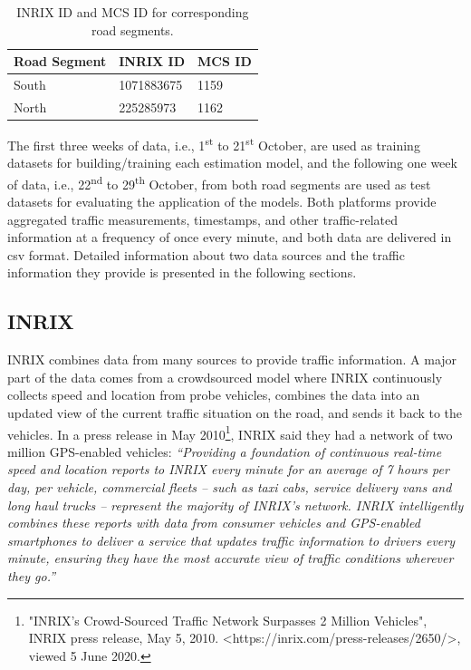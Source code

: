 \documentclass[english]{kththesis}
\begin{document}
\begin{table}[!ht]
\centering
\begin{tabular}{@{}lll@{}}
\toprule
\textbf{Road Segment} & \textbf{INRIX ID} & \textbf{MCS ID} \\
\midrule
South          & 1071883675 & 1159     \\
\midrule
North          & 225285973  & 1162     \\ 
\bottomrule
\end{tabular}
\caption{INRIX ID and MCS ID for corresponding road segments.}
\label{tab:segmentIDs}
\end{table}

The first three weeks of data, i.e., 1\textsuperscript{st} to 21\textsuperscript{st} October, are used as training datasets for building/training each estimation model, and the following one week of data, i.e., 22\textsuperscript{nd} to 29\textsuperscript{th} October, from both road segments are used as test datasets for evaluating the application of the models. Both platforms provide aggregated traffic measurements, timestamps, and other traffic-related information at a frequency of once every minute, and both data are delivered in \gls{csv} format. Detailed information about two data sources and the traffic information they provide is presented in the following sections.

\subsection{INRIX}
\label{subsec:inrix}
INRIX combines data from many sources to provide traffic information. A major part of the data comes from a crowdsourced model where INRIX continuously collects speed and location from probe vehicles, combines the data into an updated view of the current traffic situation on the road, and sends it back to the vehicles. In a press release in May 2010\footnote{"INRIX’s Crowd-Sourced Traffic Network Surpasses 2 Million Vehicles", INRIX press release, May 5, 2010. <https://inrix.com/press-releases/2650/>, viewed 5 June 2020.}, INRIX said they had a network of two million GPS-enabled vehicles: \textit{“Providing a foundation of continuous real-time speed and location reports to INRIX every minute for an average of 7 hours per day, per vehicle, commercial fleets – such as taxi cabs, service delivery vans and long haul trucks – represent the majority of INRIX’s network. INRIX intelligently combines these reports with data from consumer vehicles and GPS-enabled smartphones to deliver a service that updates traffic information to drivers every minute, ensuring they have the most accurate view of traffic conditions wherever they go.”}
\end{document}
